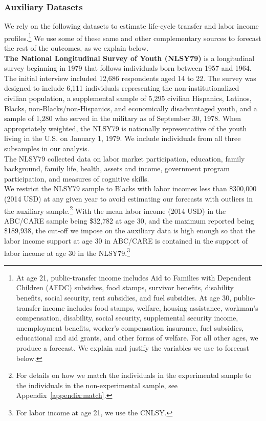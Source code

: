 \subsubsection{Auxiliary Datasets} \label{app:datasets}

\noindent We rely on the following datasets to estimate life-cycle transfer and labor income profiles.\footnote{At age 21, public-transfer income includes Aid to Families with Dependent Children (AFDC) subsidies, food stamps, survivor benefits, disability benefits, social security, rent subsidies, and fuel subsidies. At age 30, public-transfer income includes food stamps, welfare, housing assistance, workman's compensation, disability, social security, supplemental security income, unemployment benefits, worker's compensation insurance, fuel subsidies, educational and aid grants, and other forms of welfare. For all other ages, we produce a forecast. We explain and justify the variables we use to forecast below.} We use some of these same and other complementary sources to forecast the rest of the outcomes, as we explain below.\\

\noindent\textbf{The National Longitudinal Survey of Youth (NLSY79)} is a longitudinal survey beginning in 1979 that follows individuals born between 1957 and 1964. The initial interview included 12,686 respondents aged 14 to 22. The survey was designed to include 6,111 individuals representing the non-institutionalized civilian population, a supplemental sample of 5,295 civilian Hispanics, Latinos, Blacks, non-Blacks/non-Hispanics, and economically disadvantaged youth, and a sample of 1,280 who served in the military as of September 30, 1978. When appropriately weighted, the NLSY79 is nationally representative of the youth living in the U.S. on January 1, 1979. We include individuals from all three subsamples in our analysis.\\

\noindent The NLSY79 collected data on labor market participation, education, family background, family life, health, assets and income, government program participation, and measures of cognitive skills.\\

\noindent We restrict the NLSY79 sample to Blacks with labor incomes less than \$300,000 (2014 USD) at any given year to avoid estimating our forecasts with outliers in the auxiliary sample.\footnote{For details on how we match the individuals in the experimental sample to the individuals in the non-experimental sample, see Appendix~\ref{appendix:match}.} With the mean labor income (2014 USD) in the ABC/CARE sample being \$32,782 at age 30, and the maximum reported being \$189,938, the cut-off we impose on the auxiliary data is high enough so that the labor income support at age 30 in ABC/CARE is contained in the support of labor income at age 30 in the NLSY79.\footnote{For labor income at age 21, we use the CNLSY.}\\

